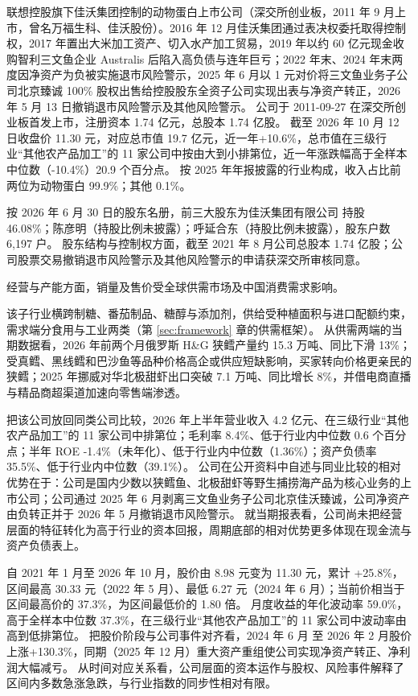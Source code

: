  联想控股旗下佳沃集团控制的动物蛋白上市公司（深交所创业板，2011 年 9 月上市，曾名万福生科、佳沃股份）。2016 年 12 月佳沃集团通过表决权委托取得控制权，2017 年置出大米加工资产、切入水产加工贸易，2019 年以约 60 亿元现金收购智利三文鱼企业 Australis 后陷入高负债与连年巨亏；2022 年末、2024 年末两度因净资产为负被实施退市风险警示，2025 年 6 月以 1 元对价将三文鱼业务子公司北京臻诚 100\% 股权出售给控股股东全资子公司实现出表与净资产转正，2026 年 5 月 13 日撤销退市风险警示及其他风险警示。 公司于 2011-09-27 在深交所创业板首发上市，注册资本 1.74 亿元，总股本 1.74 亿股。 截至 2026 年 10 月 12 日收盘价 11.30 元，对应总市值 19.7 亿元，近一年+10.6\%，总市值在三级行业“其他农产品加工”的 11 家公司中按由大到小排第位，近一年涨跌幅高于全样本中位数（-10.4\%）20.9 个百分点。 按 2025 年年报披露的行业构成，收入占比前两位为动物蛋白 99.9\%；其他 0.1\%。

 按 2026 年 6 月 30 日的股东名册，前三大股东为佳沃集团有限公司 持股 46.08\%；陈彦明（持股比例未披露）；呼延合东（持股比例未披露），股东户数 6,197 户。 股东结构与控制权方面，截至 2021 年 8 月公司总股本 1.74 亿股；公司股票交易撤销退市风险警示及其他风险警示的申请获深交所审核同意。

 经营与产能方面，销量及售价受全球供需市场及中国消费需求影响。

 该子行业横跨制糖、番茄制品、糖醇与添加剂，供给受种植面积与进口配额约束，需求端分食用与工业两类（第 \ref{sec:framework} 章的供需框架）。 从供需两端的当期数据看，2026 年前两个月俄罗斯 H\&G 狭鳕产量约 15.3 万吨、同比下滑 13\%；受真鳕、黑线鳕和巴沙鱼等品种价格高企或供应短缺影响，买家转向价格更亲民的狭鳕；2025 年挪威对华北极甜虾出口突破 7.1 万吨、同比增长 8\%，并借电商直播与精品商超渠道加速向零售端渗透。

 把该公司放回同类公司比较，2026 年上半年营业收入 4.2 亿元、在三级行业“其他农产品加工”的 11 家公司中排第位；毛利率 8.4\%、低于行业内中位数 0.6 个百分点；半年 ROE -1.4\%（未年化）、低于行业内中位数（1.36\%）；资产负债率 35.5\%、低于行业内中位数（39.1\%）。 公司在公开资料中自述与同业比较的相对优势在于：公司是国内少数以狭鳕鱼、北极甜虾等野生捕捞海产品为核心业务的上市公司；公司通过 2025 年 6 月剥离三文鱼业务子公司北京佳沃臻诚，公司净资产由负转正并于 2026 年 5 月撤销退市风险警示。 就当期报表看，公司尚未把经营层面的特征转化为高于行业的资本回报，周期底部的相对优势更多体现在现金流与资产负债表上。

 自 2021 年 1 月至 2026 年 10 月，股价由 8.98 元变为 11.30 元，累计 +25.8\%，区间最高 30.33 元（2022 年 5 月）、最低 6.27 元（2024 年 6 月）；当前价相当于区间最高价的 37.3\%，为区间最低价的 1.80 倍。 月度收益的年化波动率 59.0\%，高于全样本中位数 37.3\%，在三级行业“其他农产品加工”的 11 家公司中波动率由高到低排第位。 把股价阶段与公司事件对齐看，2024 年 6 月 至 2026 年 2 月股价上涨+130.3\%，同期（2025 年 12 月）重大资产重组使公司实现净资产转正、净利润大幅减亏。 从时间对应关系看，公司层面的资本运作与股权、风险事件解释了区间内多数急涨急跌，与行业指数的同步性相对有限。

